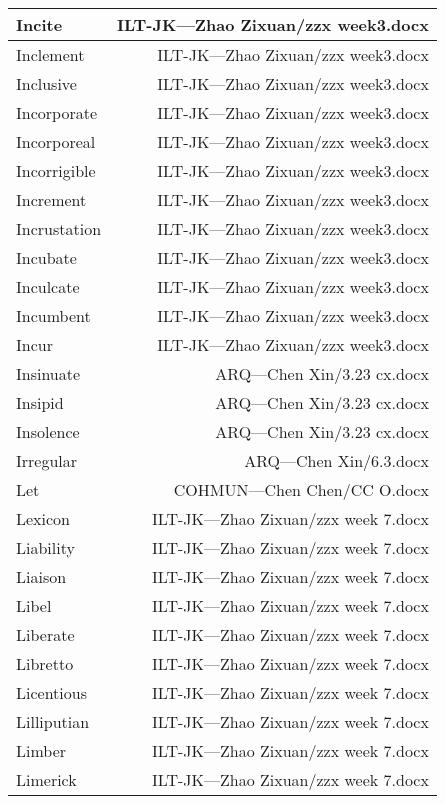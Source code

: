 \documentclass{article}
\begin{document}
\begin{center}
\begin{longtable}{|l|r|}
\hline
Incite  &  ILT-JK---Zhao Zixuan/zzx week3.docx\\  
\hline
Inclement  &  ILT-JK---Zhao Zixuan/zzx week3.docx\\  
\hline
Inclusive  &  ILT-JK---Zhao Zixuan/zzx week3.docx\\  
\hline
Incorporate  &  ILT-JK---Zhao Zixuan/zzx week3.docx\\  
\hline
Incorporeal  &  ILT-JK---Zhao Zixuan/zzx week3.docx\\  
\hline
Incorrigible  &  ILT-JK---Zhao Zixuan/zzx week3.docx\\  
\hline
Increment  &  ILT-JK---Zhao Zixuan/zzx week3.docx\\  
\hline
Incrustation  &  ILT-JK---Zhao Zixuan/zzx week3.docx\\  
\hline
Incubate  &  ILT-JK---Zhao Zixuan/zzx week3.docx\\  
\hline
Inculcate  &  ILT-JK---Zhao Zixuan/zzx week3.docx\\  
\hline
Incumbent  &  ILT-JK---Zhao Zixuan/zzx week3.docx\\  
\hline
Incur  &  ILT-JK---Zhao Zixuan/zzx week3.docx\\  
\hline
Insinuate  &  ARQ---Chen Xin/3.23 cx.docx\\  
\hline
Insipid  &  ARQ---Chen Xin/3.23 cx.docx\\  
\hline
Insolence  &  ARQ---Chen Xin/3.23 cx.docx\\  
\hline
Irregular  &  ARQ---Chen Xin/6.3.docx\\  
\hline
Let  &  COHMUN---Chen Chen/CC O.docx\\  
\hline
Lexicon  &  ILT-JK---Zhao Zixuan/zzx week 7.docx\\  
\hline
Liability  &  ILT-JK---Zhao Zixuan/zzx week 7.docx\\  
\hline
Liaison  &  ILT-JK---Zhao Zixuan/zzx week 7.docx\\  
\hline
Libel  &  ILT-JK---Zhao Zixuan/zzx week 7.docx\\  
\hline
Liberate  &  ILT-JK---Zhao Zixuan/zzx week 7.docx\\  
\hline
Libretto  &  ILT-JK---Zhao Zixuan/zzx week 7.docx\\  
\hline
Licentious  &  ILT-JK---Zhao Zixuan/zzx week 7.docx\\  
\hline
Lilliputian  &  ILT-JK---Zhao Zixuan/zzx week 7.docx\\  
\hline
Limber  &  ILT-JK---Zhao Zixuan/zzx week 7.docx\\  
\hline
Limerick  &  ILT-JK---Zhao Zixuan/zzx week 7.docx\\  

\end{longtable}
\end{center}
\end{document}
